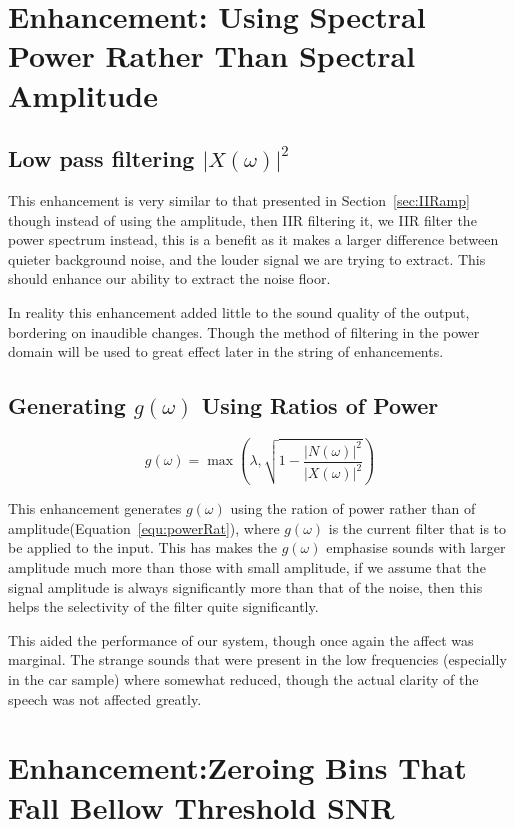 \documentclass[11pt]{article} %
\begin{document}
\begin{raggedright}
\section{Enhancement: Using Spectral Power Rather Than Spectral Amplitude} 
\subsection{Low pass filtering $\lvert X(\omega) \rvert^{2} $} 

This enhancement is very similar to that presented in Section~\ref{sec:IIRamp} though instead of using the amplitude, then IIR filtering it, we IIR filter the power spectrum instead, this is a benefit as it makes a larger difference between quieter background noise, and the louder signal we are trying to extract. This should enhance our ability to extract the noise floor. 

In reality this enhancement added little to the sound quality of the output, bordering on inaudible changes. Though the method of filtering in the power domain will be used to great effect later in the string of enhancements.  

\subsection{Generating $g(\omega)$ Using Ratios of Power} 

\begin{equation}
\label{equ:powerRat}
	g(\omega) = \max\left(\lambda, \sqrt{1- \frac{\lvert N(\omega) \rvert ^{2}}{\lvert X(\omega) \rvert ^{2}}}\right)
\end{equation}

This enhancement generates $g(\omega)$ using the ration of power rather than of amplitude(Equation~\ref{equ:powerRat}), where $g(\omega)$ is the current filter that is to be applied to the input. This has makes the $g(\omega)$ emphasise sounds with larger amplitude much more than those with small amplitude, if we assume that the signal amplitude is always significantly more than that of the noise, then this helps the selectivity of the filter quite significantly. 

This aided the performance of our system, though once again the affect was marginal. The strange sounds that were present in the low frequencies (especially in the car sample) where somewhat reduced, though the actual clarity of the speech was not affected greatly.

\section{Enhancement:Zeroing Bins That Fall Bellow Threshold SNR} 


\end{raggedright}
\end{document}

